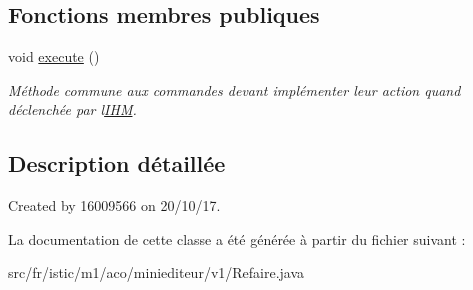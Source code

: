 \subsection*{Fonctions membres publiques}
\begin{DoxyCompactItemize}
\item 
\mbox{\label{classfr_1_1istic_1_1m1_1_1aco_1_1miniediteur_1_1v1_1_1Refaire_accb0d09315abed5674ea85477a530819}} 
void \hyperlink{classfr_1_1istic_1_1m1_1_1aco_1_1miniediteur_1_1v1_1_1Refaire_accb0d09315abed5674ea85477a530819}{execute} ()
\begin{DoxyCompactList}\small\item\em Méthode commune aux commandes devant implémenter leur action quand déclenchée par l\textquotesingle{}\hyperlink{interfacefr_1_1istic_1_1m1_1_1aco_1_1miniediteur_1_1v1_1_1IHM}{I\+HM}. \end{DoxyCompactList}\end{DoxyCompactItemize}


\subsection{Description détaillée}
Created by 16009566 on 20/10/17. 

La documentation de cette classe a été générée à partir du fichier suivant \+:\begin{DoxyCompactItemize}
\item 
src/fr/istic/m1/aco/miniediteur/v1/Refaire.\+java\end{DoxyCompactItemize}

